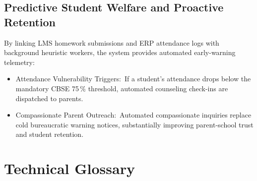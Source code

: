 \documentclass[12pt, a4paper, oneside]{report}
\def\textbf#1{#1}
\def\&{and}
\begin{document}
\section{Predictive Student Welfare \& Proactive Retention}

By linking LMS homework submissions and ERP attendance logs with background
heuristic workers, the system provides automated early-warning telemetry:
\begin{itemize}
  \item \textbf{Attendance Vulnerability Triggers:}\ If a student's attendance
        drops below the mandatory CBSE 75\,\% threshold, automated counseling
        check-ins are dispatched to parents.
  \item \textbf{Compassionate Parent Outreach:}\ Automated compassionate inquiries
        replace cold bureaucratic warning notices, substantially improving parent-school
        trust and student retention.
\end{itemize}


\chapter{Technical Glossary}
\end{document}
